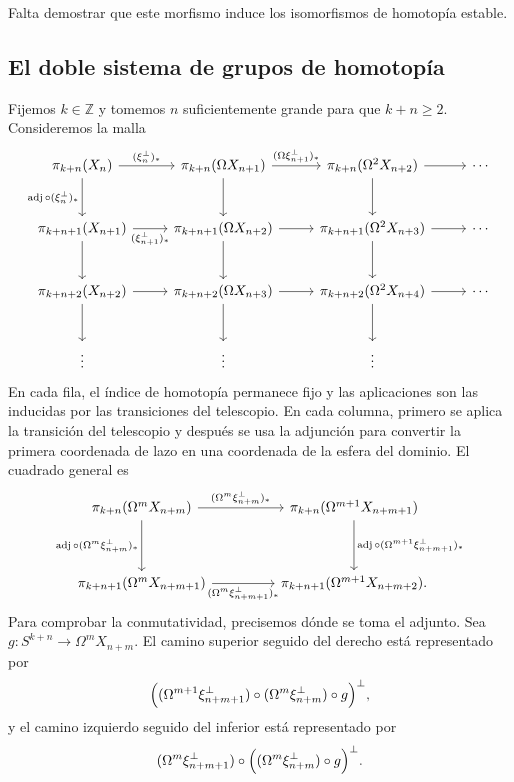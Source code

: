 Falta demostrar que este morfismo induce los isomorfismos de homotopía estable.

\subsection{El doble sistema de grupos de homotopía}

Fijemos $k\in\mathbb Z$ y tomemos $n$ suficientemente grande para que $k+n\ge2$. Consideremos la malla
\[
\begin{tikzcd}[column sep=2.5em,row sep=large]
\pi_{k+n}(X_n)
\arrow[r,"(\xi_n^{\perp})_*"]
\arrow[d,"\operatorname{adj}\circ(\xi_n^{\perp})_*"']
& \pi_{k+n}(\Omega X_{n+1})
\arrow[r,"(\Omega\xi_{n+1}^{\perp})_*"] \arrow[d]
& \pi_{k+n}(\Omega^2X_{n+2}) \arrow[r] \arrow[d] & \cdots\\
\pi_{k+n+1}(X_{n+1}) \arrow[r,"(\xi_{n+1}^{\perp})_*"'] \arrow[d]
& \pi_{k+n+1}(\Omega X_{n+2}) \arrow[r] \arrow[d]
& \pi_{k+n+1}(\Omega^2X_{n+3}) \arrow[r] \arrow[d] & \cdots\\
\pi_{k+n+2}(X_{n+2}) \arrow[r] \arrow[d]
& \pi_{k+n+2}(\Omega X_{n+3}) \arrow[r] \arrow[d]
& \pi_{k+n+2}(\Omega^2X_{n+4}) \arrow[r] \arrow[d] & \cdots\\
\vdots & \vdots & \vdots
\end{tikzcd}
\]
En cada fila, el índice de homotopía permanece fijo y las aplicaciones son las inducidas por las transiciones del telescopio. En cada columna, primero se aplica la transición del telescopio y después se usa la adjunción para convertir la primera coordenada de lazo en una coordenada de la esfera del dominio. El cuadrado general es
\[
\begin{tikzcd}[column sep=4.5em,row sep=huge]
\pi_{k+n}(\Omega^mX_{n+m})
\arrow[r,"(\Omega^m\xi_{n+m}^{\perp})_*"]
\arrow[d,"\operatorname{adj}\circ(\Omega^m\xi_{n+m}^{\perp})_*"']
& \pi_{k+n}(\Omega^{m+1}X_{n+m+1})
\arrow[d,"\operatorname{adj}\circ(\Omega^{m+1}\xi_{n+m+1}^{\perp})_*"]\\
\pi_{k+n+1}(\Omega^mX_{n+m+1})
\arrow[r,"(\Omega^m\xi_{n+m+1}^{\perp})_*"']
& \pi_{k+n+1}(\Omega^{m+1}X_{n+m+2}).
\end{tikzcd}
\]
Para comprobar la conmutatividad, precisemos dónde se toma el adjunto. Sea $g\colon S^{k+n}\to\Omega^mX_{n+m}$. El camino superior seguido del derecho está representado por
\[
\Bigl((\Omega^{m+1}\xi_{n+m+1}^{\perp})
\circ(\Omega^m\xi_{n+m}^{\perp})\circ g\Bigr)^{\perp},
\]
y el camino izquierdo seguido del inferior está representado por
\[
(\Omega^m\xi_{n+m+1}^{\perp})
\circ\Bigl((\Omega^m\xi_{n+m}^{\perp})\circ g\Bigr)^{\perp}.
\]
